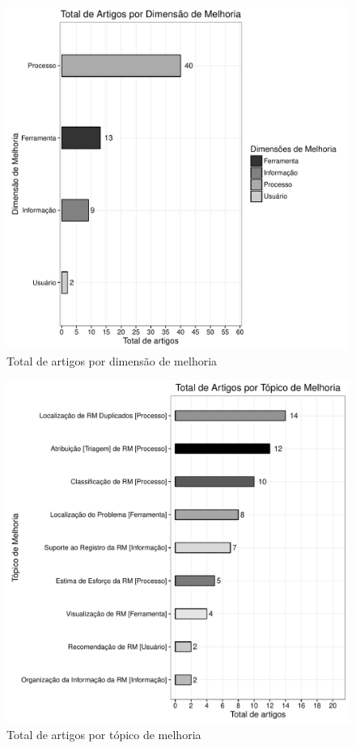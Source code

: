 \begin{figure}[htpb] \centering
	\includegraphics[width=0.9\linewidth]{./chapter-mapeamento-sistematico/img/grafico_dim_melhoria_por_artigo.pdf}
	\caption{Total de artigos por dimensão de melhoria}
	\label{fig:grafico_dim_melhoria_por_artigo} \end{figure}

\begin{figure}[htpb] \centering
	\includegraphics[width=0.8\linewidth]{./chapter-mapeamento-sistematico/img/grafico_topico_por_artigo.pdf}
	\caption{Total de artigos por tópico de melhoria}
	\label{fig:grafico_topico_por_artigo} \end{figure}

